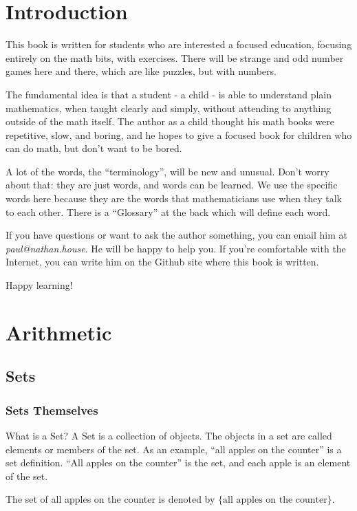 

\chapter{Introduction}

This book is written for students who are interested a focused education, focusing entirely on the math bits,
with exercises.  There will be strange and odd number games here and there, which are like puzzles, but with numbers.

The fundamental idea is that a student - a child - is able to understand plain mathematics, when taught clearly and
simply, without  attending to anything outside of the math itself. The author as a child thought his math books were
repetitive, slow, and boring, and he hopes to give a focused book for children who can do math, but don't want to be bored.

A lot of the words, the ``terminology'', will be new and unusual.  Don't worry about that: they are just words, and words
can be learned.  We use the specific words here because they are the words that mathematicians use when they talk to
each other. There is a ``Glossary'' at the back which will define each word.

If you have questions or want to ask the author something, you can email him at \textit{paul@nathan.house}. He will be happy to help you.
If you're comfortable with the Internet, you can write him on the Github site where this book is written.

Happy learning!


\chapter{Arithmetic}

\section{Sets}
\subsection{Sets Themselves}
What is a Set?
A Set is a collection of objects.
The objects in a set are called elements or members of the set.
As an example, ``all apples on the counter'' is a set definition.
``All apples on the counter'' is the set, and each apple is an element of the set.

The set of all apples on the counter is denoted by $\{ \text{all apples on the counter} \}$.

